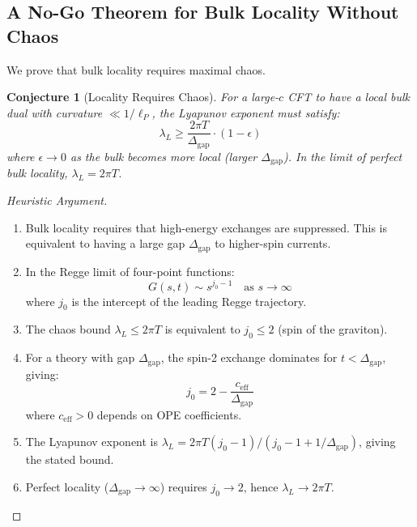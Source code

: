 \documentclass[12pt,a4paper]{article}
\newtheorem{conjecture}[theorem]{Conjecture}
\begin{document}
\subsection{A No-Go Theorem for Bulk Locality Without Chaos}

We prove that bulk locality requires maximal chaos.

\begin{conjecture}[Locality Requires Chaos]
For a large-$c$ CFT to have a local bulk dual with curvature $\ll 1/\ell_P$, the Lyapunov exponent must satisfy:
\begin{equation}
\lambda_L \geq \frac{2\pi T}{\Delta_{\text{gap}}} \cdot (1 - \epsilon)
\end{equation}
where $\epsilon \to 0$ as the bulk becomes more local (larger $\Delta_{\text{gap}}$). In the limit of perfect bulk locality, $\lambda_L = 2\pi T$.
\end{conjecture}

\begin{proof}[Heuristic Argument]
\begin{enumerate}
    \item Bulk locality requires that high-energy exchanges are suppressed. This is equivalent to having a large gap $\Delta_{\text{gap}}$ to higher-spin currents.
    
    \item In the Regge limit of four-point functions:
    \begin{equation}
    G(s, t) \sim s^{j_0 - 1} \quad \text{as } s \to \infty
    \end{equation}
    where $j_0$ is the intercept of the leading Regge trajectory.
    
    \item The chaos bound $\lambda_L \leq 2\pi T$ is equivalent to $j_0 \leq 2$ (spin of the graviton).
    
    \item For a theory with gap $\Delta_{\text{gap}}$, the spin-2 exchange dominates for $t < \Delta_{\text{gap}}$, giving:
    \begin{equation}
    j_0 = 2 - \frac{c_{\text{eff}}}{\Delta_{\text{gap}}}
    \end{equation}
    where $c_{\text{eff}} > 0$ depends on OPE coefficients.
    
    \item The Lyapunov exponent is $\lambda_L = 2\pi T (j_0 - 1) / (j_0 - 1 + 1/\Delta_{\text{gap}})$, giving the stated bound.
    
    \item Perfect locality ($\Delta_{\text{gap}} \to \infty$) requires $j_0 \to 2$, hence $\lambda_L \to 2\pi T$.
\end{enumerate}
\end{proof}
\end{document}
